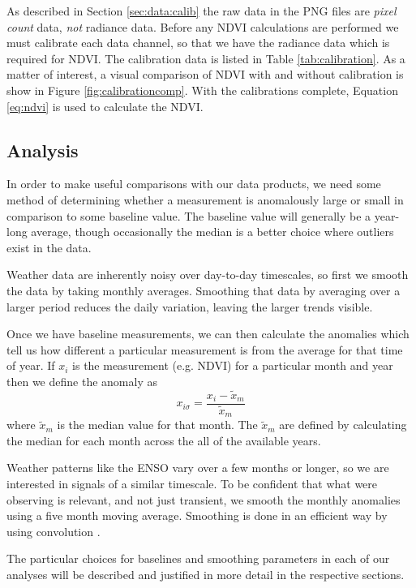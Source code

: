 As described in Section \ref{sec:data:calib} the raw data in the PNG files are
\emph{pixel count} data, \emph{not} radiance data. Before any NDVI calculations
are performed we must calibrate each data channel, so that we have the radiance
data which is required for NDVI. The calibration data is listed in Table
\ref{tab:calibration}. As a matter of interest, a visual comparison of NDVI with
and without calibration is show in Figure \ref{fig:calibrationcomp}. With the
calibrations complete, Equation \eqref{eq:ndvi} is used to calculate the NDVI.

\subsection{Analysis}
\label{sec:analysis}
In order to make useful comparisons with our data products, we need some method
of determining whether a measurement is anomalously large or small in comparison
to some baseline value. The baseline value will generally be a year-long
average, though occasionally the median is a better choice where outliers exist
in the data. 

Weather data are inherently noisy over day-to-day timescales, so first we smooth
the data by taking monthly averages. Smoothing that data by averaging over a
larger period reduces the daily variation, leaving the larger trends visible.

Once we have baseline measurements, we can then calculate the anomalies which
tell us how different a particular measurement is from the average for that time
of year. If $x_{i}$ is the measurement (e.g. NDVI) for a particular month and
year then we define the anomaly as
\begin{equation}
  x_{i\sigma}=\frac{x_{i}-\tilde{x}_m}{\tilde{x}_m}
  \label{eq:anoms}
\end{equation}
where $\tilde{x}_m$ is the median value for that month. The $\tilde{x}_m$ are
defined by calculating the median for each month across the all of the available
years.

Weather patterns like the ENSO vary over a few months or longer, so we are
interested in signals of a similar timescale. To be confident that what were
observing is relevant, and not just transient, we smooth the monthly anomalies
using a five month moving average. Smoothing is done in an efficient way by
using convolution \citep{gorry1990}.

The particular choices for baselines and smoothing parameters in each of our
analyses will be described and justified in more detail in the respective
sections.


